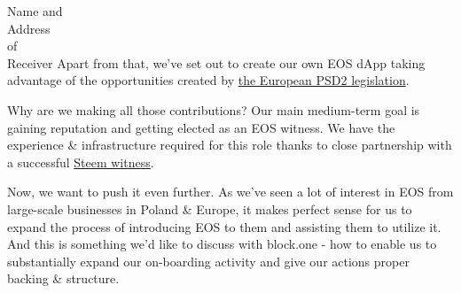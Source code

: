 \documentclass[a4paper,19pt]{letter}
\begin{document}
\begin{letter}{Name and \\ Address \\ of \\ Receiver}
Apart from that, we've set out to create our own EOS dApp taking advantage of the opportunities created by \href{https://www.evry.com/en/news/articles/psd2-the-directive-that-will-change-banking-as-we-know-it/}{the European PSD2 legislation}.

Why are we making all those contributions? Our main medium-term goal is gaining reputation and getting elected as an EOS witness. We have the experience \& infrastructure required for this role thanks to close partnership with a successful \href{https://steemit.com/@gtg}{Steem witness}.

Now, we want to push it even further. As we've seen a lot of interest in EOS from large-scale businesses in Poland \& Europe, it makes perfect sense for us to expand the process of introducing EOS to them and assisting them to utilize it. And this is something we'd like to discuss with block.one - how to enable us to substantially expand our on-boarding activity and give our actions proper backing \& structure.



\end{letter}
\end{document}
